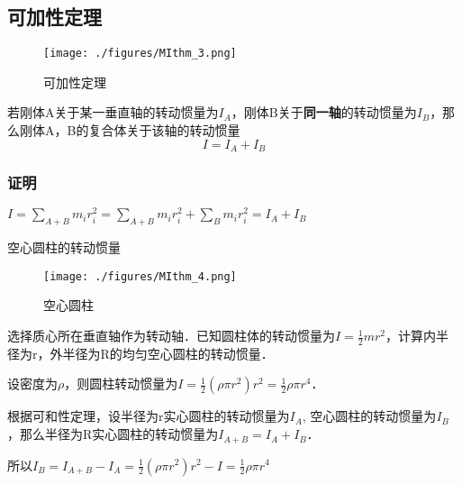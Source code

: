 \subsection{可加性定理}
\begin{figure}[ht]
\centering
\texttt{[image: ./figures/MIthm\_3.png]}
\caption{可加性定理} \label{MIthm_fig3}
\end{figure}
若刚体A关于某一垂直轴的转动惯量为$I_A$，刚体B关于\textbf{同一轴}的转动惯量为$I_B$，那么刚体A，B的复合体关于该轴的转动惯量
\begin{equation}
I=I_A+I_B
\end{equation}

\subsubsection{证明}
$I=\sum_{A+B} m_i r_i^2=\sum_{A+B} m_i r_i^2 +\sum_B m_i r_i^2 = I_A+I_B$

\begin{example}{空心圆柱的转动惯量}
\begin{figure}[ht]
\centering
\texttt{[image: ./figures/MIthm\_4.png]}
\caption{空心圆柱} \label{MIthm_fig4}
\end{figure}
选择质心所在垂直轴作为转动轴．已知圆柱体的转动惯量为$I=\frac{1}{2}mr^2$，计算内半径为r，外半径为R的均匀空心圆柱的转动惯量．

设密度为$\rho$，则圆柱转动惯量为$I=\frac{1}{2}(\rho \pi r^2) r^2=\frac{1}{2}\rho \pi r^4$．

根据可和性定理，设半径为r实心圆柱的转动惯量为$I_A$, 空心圆柱的转动惯量为$I_B$，那么半径为R实心圆柱的转动惯量为$I_{A+B}=I_A+I_B$．

所以$I_B=I_{A+B}-I_A=\frac{1}{2}(\rho \pi r^2) r^2-I=\frac{1}{2}\rho \pi r^4$
\end{example}